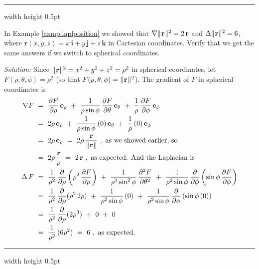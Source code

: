 \hrule width \textwidth height 0.5pt
\begin{exmp}
 In Example \ref{exmp:laplposition} we showed that $\nabla \lVert\mspace{1mu}\textbf{r}\mspace{1mu}\rVert^2 = 2\,\textbf{r}$ and
 $\Delta \lVert\mspace{1mu}\textbf{r}\mspace{1mu}\rVert^2 = 6$, where $\textbf{r}(x,y,z) = x\,\textbf{i} + y\,\textbf{j} + z\,\textbf{k}$ in
 Cartesian coordinates. Verify that we get the same answers if we switch to spherical coordinates.\vspace{1mm}
 \par\noindent \emph{Solution:} Since $\lVert\mspace{1mu}\textbf{r}\mspace{1mu}\rVert^2 = x^2 + y^2 + z^2 = \rho^2$ in spherical
 coordinates, let $F(\rho,\theta,\phi) = \rho^2$ (so that $F(\rho,\theta,\phi) =
 \lVert\mspace{1mu}\textbf{r}\mspace{1mu}\rVert^2$). The gradient of $F$ in spherical coordinates is
 \begin{align*}
  \nabla F ~&=~ \frac{\partial F}{\partial \rho}\,\textbf{e}_{\rho} ~+~
   \frac{1}{\rho \sin \phi}\,\frac{\partial F}{\partial \theta}\,\textbf{e}_{\theta} ~+~
   \frac{1}{\rho}\,\frac{\partial F}{\partial \phi}\,\textbf{e}_{\phi}\\
   &=~ 2\rho\,\textbf{e}_{\rho} ~+~ \frac{1}{\rho \sin \phi}\,(0)\,\textbf{e}_{\theta} ~+~
    \frac{1}{\rho}\,(0)\,\textbf{e}_{\phi}\\
   &=~ 2\rho\,\textbf{e}_{\rho} ~=~ 2\rho\,\frac{\textbf{r}}{\lVert\mspace{1mu}\textbf{r}\mspace{1mu}\rVert} ~,~\text{as we showed earlier, so}\\
   &=~ 2\rho\,\frac{\textbf{r}}{\rho} ~=~ 2\,\textbf{r} ~,~\text{as expected. And the Laplacian is}\\
  \Delta\,F ~&=~ \frac{1}{\rho^2}\,\frac{\partial}{\partial \rho} \left( \rho^2 \,
   \frac{\partial F}{\partial \rho} \right) ~+~ \frac{1}{\rho^2 \sin^2 \phi}\,\frac{\partial^2 F}{\partial \theta^2} ~+~
   \frac{1}{\rho^2 \sin \phi}\,\frac{\partial}{\partial \phi} \left( \sin \phi \,\frac{\partial F}{\partial \phi}
   \right)\\
   &=~ \frac{1}{\rho^2}\,\frac{\partial}{\partial \rho} ( \rho^2 \,2\rho ) ~+~ \frac{1}{\rho^2 \sin \phi}\,(0) ~+~
    \frac{1}{\rho^2 \sin \phi}\,\frac{\partial}{\partial \phi} \left( \sin \phi \,(0) \right)\\
   &=~ \frac{1}{\rho^2}\,\frac{\partial}{\partial \rho} ( 2\rho^3 ) ~+~ 0 ~+~ 0\\
   &=~ \frac{1}{\rho^2}\,(6\rho^2 ) ~=~ 6 ~,~\text{as expected.}
 \end{align*}
\end{exmp}
\hrule width \textwidth height 0.5pt
\newpage
\centerline{}\label{sec4dot6}
